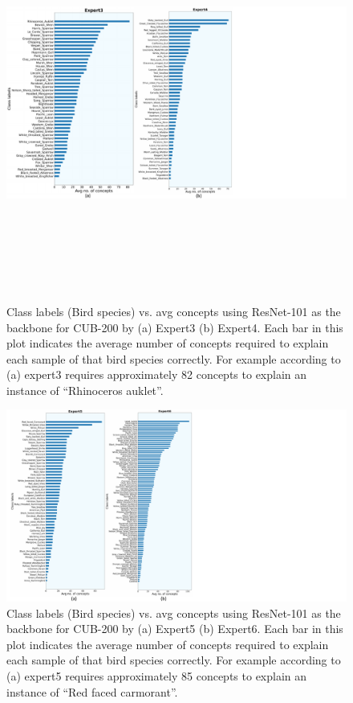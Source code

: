 \begin{figure}
\centering
\includegraphics[width=15cm, height=13cm]
{figures/Supp/Avg_concept_class_CNN_cub_2.pdf}
\caption{Class labels (Bird species) vs. avg concepts using  ResNet-101 as the backbone for CUB-200 by (a) Expert3 (b) Expert4. Each bar in this plot indicates the average number of concepts required to explain each sample of that bird species correctly. For example according to (a) expert3 requires approximately 82 concepts to explain an instance of ``Rhinoceros auklet''.}
\label{fig:cnn_cub_concept_3_4}
\end{figure}

\begin{figure}
\centering
\includegraphics[width=1\linewidth]
{figures/Supp/Avg_concept_class_CNN_cub_3.pdf}
\caption{Class labels (Bird species) vs. avg concepts using  ResNet-101 as the backbone for CUB-200 by (a) Expert5 (b) Expert6. Each bar in this plot indicates the average number of concepts required to explain each sample of that bird species correctly. For example according to (a) expert5 requires approximately 85 concepts to explain an instance of ``Red faced carmorant''.}
\label{fig:cnn_cub_concept_5_6}
\end{figure}


